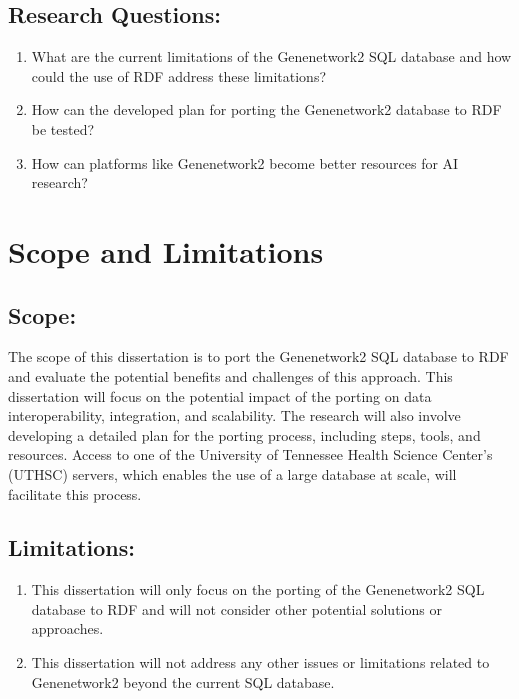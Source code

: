 \subsection*{Research Questions:}

\begin{enumerate}
\item What are the current limitations of the Genenetwork2 SQL database and how could the use of RDF address these limitations?
\item How can the developed plan for porting the Genenetwork2 database to RDF be tested?
\item How can platforms like Genenetwork2 become better resources for AI research?
\end{enumerate}


\section{Scope and Limitations}
\subsection*{Scope:}

The scope of this dissertation is to port the Genenetwork2 SQL database to RDF and evaluate the potential benefits and challenges of this approach.  This dissertation will focus on the potential impact of the porting on data interoperability, integration, and scalability.  The research will also involve developing a detailed plan for the porting process, including steps, tools, and resources.  Access to one of the University of Tennessee Health Science Center's (UTHSC) servers, which enables the use of a large database at scale, will facilitate this process.

\subsection*{Limitations:}

\begin{enumerate}
\item This dissertation will only focus on the porting of the Genenetwork2 SQL database to RDF and will not consider other potential solutions or approaches.
\item This dissertation will not address any other issues or limitations related to Genenetwork2 beyond the current SQL database.
\end{enumerate}
